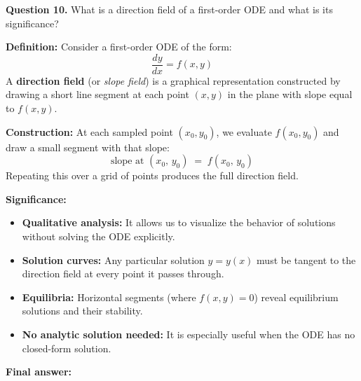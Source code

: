 \textbf{Question 10.} What is a direction field of a first-order ODE and what is its significance?
\begin{respuesta}

\textbf{Definition:} Consider a first-order ODE of the form:
\[
\frac{dy}{dx} = f(x,y)
\]
A \textbf{direction field} (or \textit{slope field}) is a graphical representation 
constructed by drawing a short line segment at each point $(x,y)$ in the plane 
with slope equal to $f(x,y)$.

\medskip
\textbf{Construction:} At each sampled point $(x_0, y_0)$, we evaluate $f(x_0,y_0)$ 
and draw a small segment with that slope:
\[
\text{slope at } (x_0,\, y_0) \;=\; f(x_0,\, y_0)
\]
Repeating this over a grid of points produces the full direction field.

\medskip
\textbf{Significance:}
\begin{itemize}
    \item \textbf{Qualitative analysis:} It allows us to visualize the behavior 
    of solutions without solving the ODE explicitly.
    \item \textbf{Solution curves:} Any particular solution $y=y(x)$ must be 
    tangent to the direction field at every point it passes through.
    \item \textbf{Equilibria:} Horizontal segments (where $f(x,y)=0$) reveal 
    equilibrium solutions and their stability.
    \item \textbf{No analytic solution needed:} It is especially useful when 
    the ODE has no closed-form solution.
\end{itemize}

    \textbf{Final answer:}
    \begin{center}
    \end{center}
\end{respuesta}










